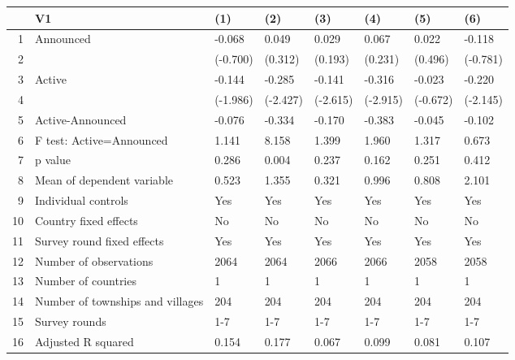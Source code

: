 \begin{table}[ht]
\centering
\begin{tabular}{rlllllll}
  \hline
 & V1 & (1) & (2) & (3) & (4) & (5) & (6) \\ 
  \hline
1 & Announced & -0.068 & 0.049 & 0.029 & 0.067 & 0.022 & -0.118 \\ 
  2 &  & (-0.700) & (0.312) & (0.193) & (0.231) & (0.496) & (-0.781) \\ 
  3 & Active & -0.144 & -0.285 & -0.141 & -0.316 & -0.023 & -0.220 \\ 
  4 &  & (-1.986) & (-2.427) & (-2.615) & (-2.915) & (-0.672) & (-2.145) \\ 
  5 & Active-Announced & -0.076 & -0.334 & -0.170 & -0.383 & -0.045 & -0.102 \\ 
  6 & F test: Active=Announced & 1.141 & 8.158 & 1.399 & 1.960 & 1.317 & 0.673 \\ 
  7 & p value & 0.286 & 0.004 & 0.237 & 0.162 & 0.251 & 0.412 \\ 
  8 & Mean of dependent variable & 0.523 & 1.355 & 0.321 & 0.996 & 0.808 & 2.101 \\ 
  9 & Individual controls & Yes & Yes & Yes & Yes & Yes & Yes \\ 
  10 & Country fixed effects & No & No & No & No & No & No \\ 
  11 & Survey round fixed effects & Yes & Yes & Yes & Yes & Yes & Yes \\ 
  12 & Number of observations & 2064 & 2064 & 2066 & 2066 & 2058 & 2058 \\ 
  13 & Number of countries & 1 & 1 & 1 & 1 & 1 & 1 \\ 
  14 & Number of townships and villages & 204 & 204 & 204 & 204 & 204 & 204 \\ 
  15 & Survey rounds & 1-7 & 1-7 & 1-7 & 1-7 & 1-7 & 1-7 \\ 
  16 & Adjusted R squared & 0.154 & 0.177 & 0.067 & 0.099 & 0.081 & 0.107 \\ 
   \hline
\end{tabular}
\end{table}
